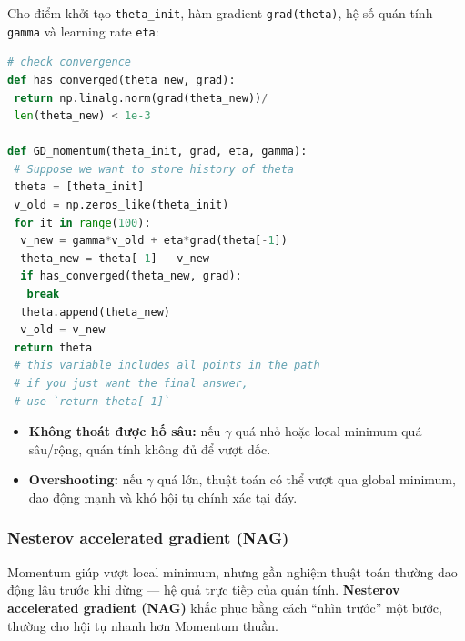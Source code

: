 \begin{phuongphap}[title={Cài đặt \texttt{GD\_momentum} trong Python}]
Cho điểm khởi tạo \texttt{theta\_init}, hàm gradient \texttt{grad(theta)}, hệ số quán tính \texttt{gamma} và learning rate \texttt{eta}:
\begin{lstlisting}[language=Python]
# check convergence
def has_converged(theta_new, grad):
 return np.linalg.norm(grad(theta_new))/
 len(theta_new) < 1e-3

def GD_momentum(theta_init, grad, eta, gamma):
 # Suppose we want to store history of theta
 theta = [theta_init]
 v_old = np.zeros_like(theta_init)
 for it in range(100):
  v_new = gamma*v_old + eta*grad(theta[-1])
  theta_new = theta[-1] - v_new
  if has_converged(theta_new, grad):
   break
  theta.append(theta_new)
  v_old = v_new
 return theta
 # this variable includes all points in the path
 # if you just want the final answer,
 # use `return theta[-1]`
\end{lstlisting}
\end{phuongphap}

\begin{luuy}[title={Hạn chế của Momentum}]
\begin{itemize}
 \item \textbf{Không thoát được hố sâu:} nếu $\gamma$ quá nhỏ hoặc local minimum quá sâu/rộng, quán tính không đủ để vượt dốc.
 \item \textbf{Overshooting:} nếu $\gamma$ quá lớn, thuật toán có thể vượt qua global minimum, dao động mạnh và khó hội tụ chính xác tại đáy.
\end{itemize}
\end{luuy}

\subsubsection{Nesterov accelerated gradient (NAG)}

\begin{luuy}[title={Hạn chế của Momentum thuần}]
Momentum giúp vượt local minimum, nhưng gần nghiệm thuật toán thường dao động lâu trước khi dừng --- hệ quả trực tiếp của quán tính. \textbf{Nesterov accelerated gradient (NAG)} khắc phục bằng cách ``nhìn trước'' một bước, thường cho hội tụ nhanh hơn Momentum thuần.
\end{luuy}

